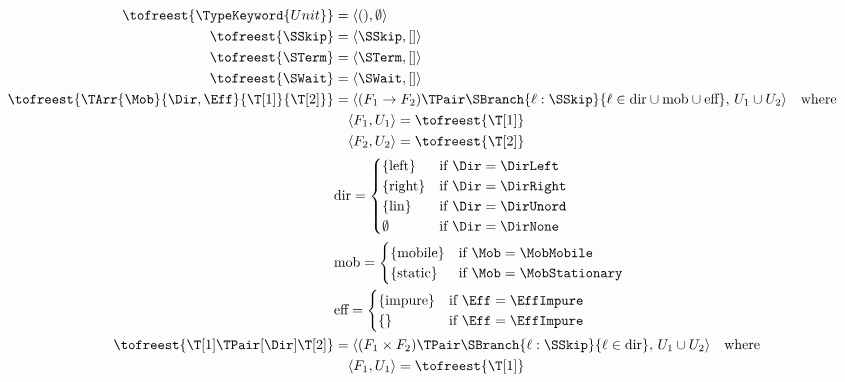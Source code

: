\begin{figure}[tp]
  \footnotesize
  \setlength{\jot}{0.1ex}
  \begin{align*}
    \tofreest{\TypeKeyword{Unit}}
      & = \langle (), \emptyset \rangle \\
    \tofreest{\SSkip}
      & = \langle \SSkip, [] \rangle \\
    \tofreest{\STerm}
      & = \langle \STerm, [] \rangle \\
    \tofreest{\SWait}
      & = \langle \SWait, [] \rangle \\
    \tofreest{\TArr{\Mob}{\Dir, {\Eff}}{\T[1]}{\T[2]}}
      & = \langle (F_1 \to F_2) \TPair \SBranch {\ell : \SSkip} {\ell \in \text{dir} \cup \text{mob} \cup \text{eff}},\,
        U_1 \cup U_2 \rangle \quad \text{where} \\
      & \quad \langle F_1, U_1 \rangle = \tofreest{\T[1]} \\
      & \quad \langle F_2, U_2 \rangle = \tofreest{\T[2]} \\
      & \text{dir} = \begin{cases}
        \{ \text{left} \} & \text{if } \Dir = \DirLeft \\
        \{ \text{right} \} & \text{if } \Dir = \DirRight \\
        \{ \text{lin} \} & \text{if } \Dir = \DirUnord \\
        \emptyset & \text{if } \Dir = \DirNone \\
      \end{cases} \\
      & \text{mob} = \begin{cases}
        \{ \text{mobile} \} & \text{if } \Mob = \MobMobile \\
        \{ \text{static} \} & \text{if } \Mob = \MobStationary \\
      \end{cases} \\
      & \text{eff} = \begin{cases}
        \{ \text{impure} \} & \text{if } \Eff = \EffImpure \\
        \{ \text{} \} & \text{if } \Eff = \EffImpure \\
      \end{cases} \\
    \tofreest{\T[1] \TPair[\Dir] \T[2]}
      & = \langle (F_1 \times F_2) \TPair \SBranch {\ell : \SSkip} {\ell \in \text{dir}},\,
        U_1 \cup U_2 \rangle \quad \text{where} \\
      & \quad \langle F_1, U_1 \rangle = \tofreest{\T[1]} \\

\end{align*}
\end{figure}
